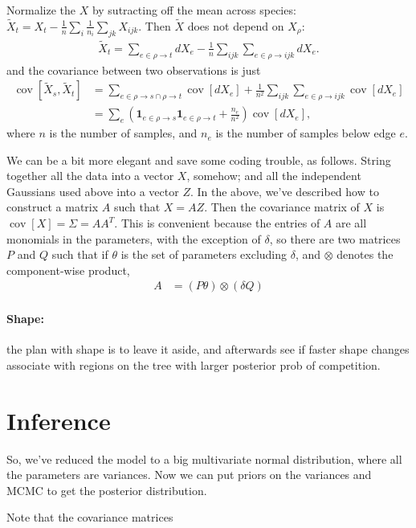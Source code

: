 \documentclass{article}
\DeclareMathOperator{\cov}{cov}
\begin{document}
Normalize the $X$ by sutracting off the mean across species: 
$\tilde X_t = X_t - \frac{1}{n}\sum_i \frac{1}{n_i} \sum_{jk} X_{ijk}$.
Then $\tilde X$ does not depend on $X_\rho$:
\begin{align}
    \tilde X_t = \sum_{e \in \rho \to t} dX_e - \frac{1}{n}\sum_{ijk} \sum_{e \in \rho \to ijk} dX_e .
\end{align}
and the covariance between two observations is just
\begin{align}
    \cov[\tilde X_s,\tilde X_t] &= \sum_{e \in \rho \to s \cap \rho \to t} \cov[dX_e] +  \frac{1}{n^2} \sum_{ijk} \sum_{e \in \rho \to ijk} \cov[ dX_e ] \\
    &= \sum_e \left( \mathbf{1}_{e \in \rho \to s} \mathbf{1}_{e \in \rho \to t} + \frac{n_e}{n^2} \right) \cov[dX_e] ,
\end{align}
where $n$ is the number of samples, and $n_e$ is the number of samples below edge $e$.


We can be a bit more elegant and save some coding trouble, as follows.
String together all the data into a vector $X$, somehow; 
and all the independent Gaussians used above into a vector $Z$.
In the above, we've described how to construct a matrix $A$ such that $X = AZ$.
Then the covariance matrix of $X$ is $\cov[X] = \Sigma = A A^T$.
This is convenient because the entries of $A$ are all monomials in the parameters, 
with the exception of $\delta$, so there are two matrices $P$ and $Q$ such that
if $\theta$ is the set of parameters excluding $\delta$, 
and $\otimes$ denotes the component-wise product,
\begin{align}
    A &= ( P \theta ) \otimes ( \delta Q ) 
\end{align}


\paragraph{Shape:} the plan with shape is to leave it aside, 
and afterwards see if faster shape changes associate with regions on the tree with larger posterior prob of competition.


\section{Inference}

So, we've reduced the model to a big multivariate normal distribution,
where all the parameters are variances.
Now we can put priors on the variances and MCMC to get the posterior distribution.

Note that the covariance matrices
\end{document}
